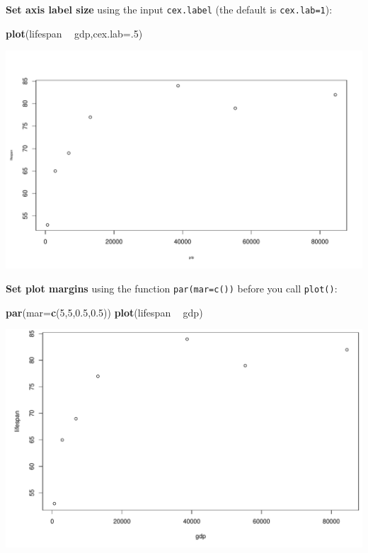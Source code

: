 \documentclass[
]{book}
\newenvironment{Shaded}{\begin{snugshade}}{\end{snugshade}}
\newcommand{\DataTypeTok}[1]{\textcolor[rgb]{0.13,0.29,0.53}{#1}}
\newcommand{\DecValTok}[1]{\textcolor[rgb]{0.00,0.00,0.81}{#1}}
\newcommand{\FloatTok}[1]{\textcolor[rgb]{0.00,0.00,0.81}{#1}}
\newcommand{\KeywordTok}[1]{\textcolor[rgb]{0.13,0.29,0.53}{\textbf{#1}}}
\newcommand{\NormalTok}[1]{#1}
\newcommand{\OperatorTok}[1]{\textcolor[rgb]{0.81,0.36,0.00}{\textbf{#1}}}
\newcommand{\StringTok}[1]{\textcolor[rgb]{0.31,0.60,0.02}{#1}}
\begin{document}
\textbf{Set axis label size} using the input \texttt{cex.label} (the default is \texttt{cex.lab=1}):

\begin{Shaded}
\begin{Highlighting}[]
\KeywordTok{plot}\NormalTok{(lifespan }\OperatorTok{~}\StringTok{ }\NormalTok{gdp,}\DataTypeTok{cex.lab=}\NormalTok{.}\DecValTok{5}\NormalTok{)}
\end{Highlighting}
\end{Shaded}

\includegraphics{figures/unnamed-chunk-94-1.pdf}

\textbf{Set plot margins} using the function \texttt{par(mar=c())} before you call \texttt{plot()}:

\begin{Shaded}
\begin{Highlighting}[]
\KeywordTok{par}\NormalTok{(}\DataTypeTok{mar=}\KeywordTok{c}\NormalTok{(}\DecValTok{5}\NormalTok{,}\DecValTok{5}\NormalTok{,}\FloatTok{0.5}\NormalTok{,}\FloatTok{0.5}\NormalTok{))}
\KeywordTok{plot}\NormalTok{(lifespan }\OperatorTok{~}\StringTok{ }\NormalTok{gdp)}
\end{Highlighting}
\end{Shaded}

\includegraphics{figures/unnamed-chunk-95-1.pdf}
\end{document}

